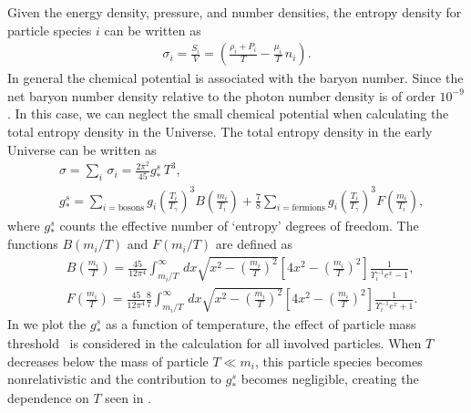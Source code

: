 {Given the energy density, pressure, and number densities, the entropy density for particle species $i$ can be written as 
\begin{align}\label{entropy}
\sigma_i=\frac{S_i}{V}=\left(\frac{\rho_i+P_i}{T}-\frac{\mu_i}{T}\,n_i\right).
\end{align}
In general the chemical potential is associated with the baryon number. Since the net baryon number density relative to the photon number density is of order $10^{-9}$. In this case, we can neglect the small chemical potential when calculating the total entropy density in the Universe. The total entropy density in the early Universe can be written as
\begin{align}
&\sigma=\sum_i\,\sigma_i=\frac{2\pi^2}{45}g^s_\ast\,T^3,\\
&g^s_\ast=\sum_{i=\mathrm{bosons}}g_i\left({\frac{T_i}{T_\gamma}}\right)^3B\left(\frac{m_i}{T_i}\right)+\frac{7}{8}\sum_{i=\mathrm{fermions}}g_i\left({\frac{T_i}{T_\gamma}}\right)^3F\left(\frac{m_i}{T_i}\right),
\end{align}
where $g^s_\ast$ counts the effective number of `entropy' degrees of freedom. The functions $B(m_i/T)$ and $F(m_i/T)$ are defined as 
\begin{align}
&B\left(\frac{m_i}{T}\right)=\frac{45}{12\pi^4}\int^\infty_{m_i/T}\,dx\sqrt{x^2-\left(\frac{m_i}{T}\right)^2}\left[4x^2-\left(\frac{m_i}{T}\right)^2\right]\frac{1}{\Upsilon^{-1}_ie^x-1},\\
&F\left(\frac{m_i}{T}\right)=\frac{45}{12\pi^4}\frac{8}{7}\int^\infty_{m_i/T}\,dx\sqrt{x^2-\left(\frac{m_i}{T}\right)^2}\left[4x^2-\left(\frac{m_i}{T}\right)^2\right]\frac{1}{\Upsilon^{-1}_ie^x+1}.
\end{align}
In  we plot the $g^s_\ast$ as a function of temperature, the effect of particle mass threshold~\cite{Coc:2006rt} is considered in the calculation for all involved particles. When $T$ decreases below the mass of particle $T\ll m_i$, this particle species becomes nonrelativistic and the contribution to $g^s_\ast$ becomes negligible, creating the dependence on $T$ seen in .

}
